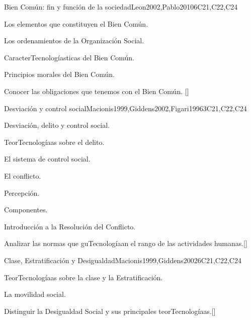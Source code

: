 \begin{syllabus}
\begin{unit}{}{Bien Común: fin y función de la sociedad}{Leon2002,Pablo2010}{6}{C21,C22,C24}
\begin{topics}
    \item Los elementos que constituyen el Bien Común.
    \item Los ordenamientos de la Organización Social.
    \item CaracterTecnologíasticas del Bien Común.
    \item Principios morales del Bien Común.
\end{topics}
\begin{learningoutcomes}
    \item Conocer las obligaciones que tenemos con el Bien Común. [\Familiarity]
\end{learningoutcomes}
\end{unit}

\begin{unit}{}{Desviación y control social}{Macionis1999,Giddens2002,Figari1996}{3}{C21,C22,C24}
\begin{topics}
    \item Desviación, delito  y control social.
    \item TeorTecnologíaas sobre el delito.
    \item El sistema de control social.
    \item El conflicto.
    \begin{subtopics}
	    \item Percepción.
	    \item Componentes.
    \end{subtopics}
    \item Introducción a la Resolución del Conflicto.
\end{topics}
\begin{learningoutcomes}
    \item Analizar las normas que guTecnologíaan el rango de las actividades humanas.[\Familiarity]
\end{learningoutcomes}
\end{unit}

\begin{unit}{}{Clase, Estratificación y Desigualdad}{Macionis1999,Giddens2002}{6}{C21,C22,C24}
\begin{topics}
    \item TeorTecnologíaas sobre la clase y la  Estratificación.
    \item La movilidad social.
\end{topics}
\begin{learningoutcomes}
	\item Distinguir la Desigualdad Social y sus principales teorTecnologíaas.[\Familiarity]
\end{learningoutcomes}
\end{unit}


\end{syllabus}
